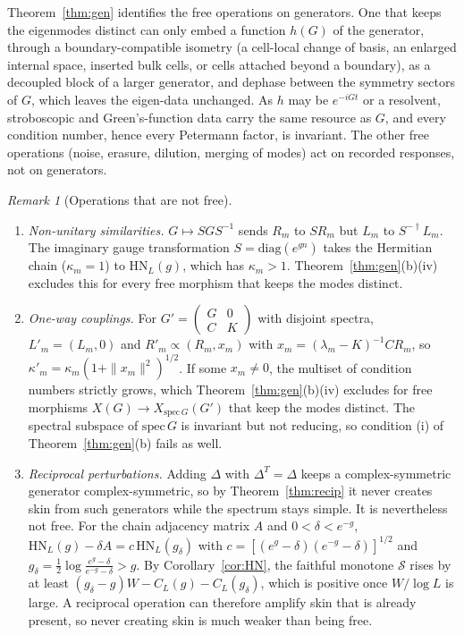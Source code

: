 \documentclass[11pt]{article}
\theoremstyle{definition}
\theoremstyle{remark}
\newtheorem{remark}{Remark}
\begin{document}
Theorem~\ref{thm:gen} identifies the free operations on generators. One that keeps the eigenmodes distinct can only embed a function $h(G)$ of the generator, through a boundary-compatible isometry (a cell-local change of basis, an enlarged internal space, inserted bulk cells, or cells attached beyond a boundary), as a decoupled block of a larger generator, and dephase between the symmetry sectors of $G$, which leaves the eigen-data unchanged. As $h$ may be $e^{-iGt}$ or a resolvent, stroboscopic and Green's-function data carry the same resource as $G$, and every condition number, hence every Petermann factor, is invariant. The other free operations (noise, erasure, dilution, merging of modes) act on recorded responses, not on generators.

\begin{remark}[Operations that are not free]\label{rem:notfree}
\leavevmode
\begin{enumerate}
\item[(a)] \emph{Non-unitary similarities.} $G\mapsto SGS^{-1}$ sends $R_m$ to $SR_m$ but $L_m$ to $S^{-\dagger}L_m$. The imaginary gauge transformation $S=\mathrm{diag}(e^{gn})$ takes the Hermitian chain ($\kappa_m=1$) to $\mathrm{HN}_L(g)$, which has $\kappa_m>1$. Theorem~\ref{thm:gen}(b)(iv) excludes this for every free morphism that keeps the modes distinct.
\item[(b)] \emph{One-way couplings.} For $G'=\left(\begin{smallmatrix}G&0\\C&K\end{smallmatrix}\right)$ with disjoint spectra, $L'_m=(L_m,0)$ and $R'_m\propto(R_m,x_m)$ with $x_m=(\lambda_m-K)^{-1}CR_m$, so $\kappa'_m=\kappa_m(1+\|x_m\|^2)^{1/2}$. If some $x_m\ne0$, the multiset of condition numbers strictly grows, which Theorem~\ref{thm:gen}(b)(iv) excludes for free morphisms $X(G)\to X_{\mathrm{spec}\,G}(G')$ that keep the modes distinct. The spectral subspace of $\mathrm{spec}\,G$ is invariant but not reducing, so condition (i) of Theorem~\ref{thm:gen}(b) fails as well.
\item[(c)] \emph{Reciprocal perturbations.} Adding $\Delta$ with $\Delta^T=\Delta$ keeps a complex-symmetric generator complex-symmetric, so by Theorem~\ref{thm:recip} it never creates skin from such generators while the spectrum stays simple. It is nevertheless not free. For the chain adjacency matrix $A$ and $0<\delta<e^{-g}$, $\mathrm{HN}_L(g)-\delta A=c\,\mathrm{HN}_L(g_\delta)$ with $c=[(e^g-\delta)(e^{-g}-\delta)]^{1/2}$ and $g_\delta=\frac12\log\frac{e^g-\delta}{e^{-g}-\delta}>g$. By Corollary~\ref{cor:HN}, the faithful monotone $\mathcal S$ rises by at least $(g_\delta-g)W-C_L(g)-C_L(g_\delta)$, which is positive once $W/\log L$ is large. A reciprocal operation can therefore amplify skin that is already present, so never creating skin is much weaker than being free.

\end{enumerate}
\end{remark}
\end{document}
